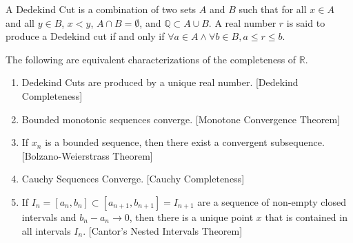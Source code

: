 \documentclass[crop=false,class=book,oneside]{standalone}
\begin{document}
            \begin{definition}
            A Dedekind Cut is a combination of two sets $A$ and $B$ such that for all $x\in A$ and all $y\in B$, $x< y$, $A\cap B=\emptyset$, and $\mathbb{Q} \subset A\cup B$. A real number $r$ is said to produce a Dedekind cut if and only if $\forall a\in A\land \forall b\in B, a\leq r\leq b$.
            \end{definition}
            \begin{theorem}
            The following are equivalent characterizations of the completeness of $\mathbb{R}$.
            \begin{enumerate}
                \item Dedekind Cuts are produced by a unique real number. \hfill [Dedekind Completeness]
                \item Bounded monotonic sequences converge. \hfill [Monotone Convergence Theorem]
                \item If $x_n$ is a bounded sequence, then there exist a convergent subsequence. \hfill [Bolzano-Weierstrass Theorem]
                \item Cauchy Sequences Converge. \hfill [Cauchy Completeness]
                \item If $I_n = [a_n,b_n]\subset [a_{n+1},b_{n+1}]=I_{n+1}$ are a sequence of non-empty closed intervals and $b_n-a_n \rightarrow 0$, then there is a unique point $x$ that is contained in all intervals $I_n$. \hfill [Cantor's Nested Intervals Theorem]
            \end{enumerate}
            \end{theorem}
\end{document}

